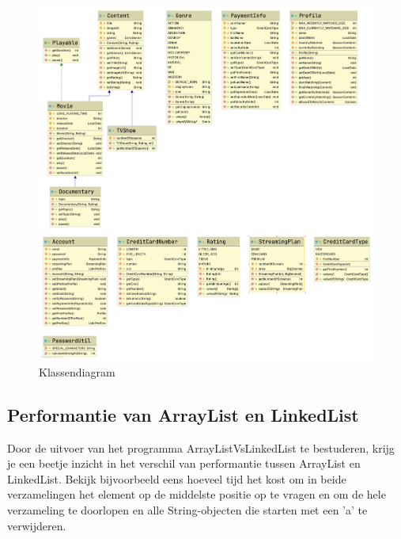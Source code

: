 \documentclass{tstextbook}
\begin{document}
\begin{figure}[H]
\includegraphics[width=\linewidth]{images/klassendiagram/diagram_H4.png}
\caption{Klassendiagram}
\label{fig:klassendiagram}
\end{figure}

\subsection{Performantie van ArrayList en LinkedList}

Door de uitvoer van het programma ArrayListVsLinkedList te bestuderen, krijg je een beetje inzicht in het verschil van performantie tussen ArrayList en LinkedList.
Bekijk bijvoorbeeld eens hoeveel tijd het kost om in beide verzamelingen het element op de middelste positie op te vragen en om de hele verzameling te doorlopen en alle String-objecten die starten met een 'a' te verwijderen.
\end{document}

